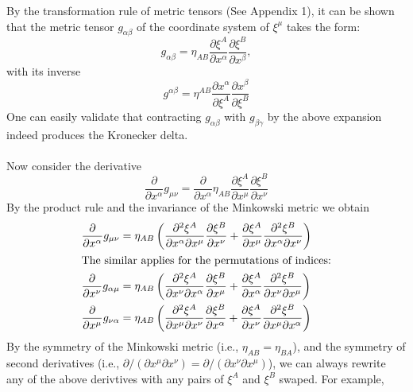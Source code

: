 \documentclass{article}
\begin{document}
By the transformation rule of metric tensors (See Appendix 1), it can be shown 
that the metric tensor $g_{\alpha\beta}$ of the coordinate system of 
$\xi^\mu$ takes the form:
\[
g_{\alpha\beta} = \eta_{AB} \frac{\partial \xi^A}{\partial x^\alpha} \frac{\partial \xi^B}{\partial x^\beta},
\]
with its inverse
\[
g^{\alpha\beta} = \eta^{AB} \frac{\partial x^\alpha}{\partial \xi^A} \frac{\partial x^\beta}{\partial \xi^B}
\]
One can easily validate that contracting $g_{\alpha\beta}$ with 
$g_{\beta\gamma}$ by the above expansion indeed produces the 
Kronecker delta.\\\\
Now consider the derivative
\[
\frac{\partial}{\partial x^\alpha} g_{\mu\nu} = 
\frac{\partial}{\partial x^\alpha} \eta_{AB} \frac{\partial \xi^A}{\partial x^\mu} \frac{\partial \xi^B}{\partial x^\nu}
\]
By the product rule and the invariance of the Minkowski metric we obtain
\begin{align*}
\frac{\partial}{\partial x^\alpha} g_{\mu\nu} &= 
\eta_{AB} \left(\frac{\partial^2 \xi^A}{\partial x^\alpha \partial x^\mu} \frac{\partial \xi^B}{\partial x^\nu}
+ \frac{\partial \xi^A}{\partial x^\mu} \frac{\partial^2 \xi^B}{\partial x^\alpha \partial x^\nu}\right) \\
\intertext{The similar applies for the permutations of indices:} 
\frac{\partial}{\partial x^\nu} g_{\alpha\mu} &= 
\eta_{AB} \left(\frac{\partial^2 \xi^A}{\partial x^\nu \partial x^\alpha} \frac{\partial \xi^B}{\partial x^\mu}
+ \frac{\partial \xi^A}{\partial x^\alpha} \frac{\partial^2 \xi^B}{\partial x^\nu \partial x^\mu}\right) \\
\frac{\partial}{\partial x^\mu} g_{\nu\alpha} &= 
\eta_{AB} \left(\frac{\partial^2 \xi^A}{\partial x^\mu \partial x^\nu} \frac{\partial \xi^B}{\partial x^\alpha}
+ \frac{\partial \xi^A}{\partial x^\nu} \frac{\partial^2 \xi^B}{\partial x^\mu \partial x^\alpha}\right)
\end{align*}
By the symmetry of the Minkowski metric (i.e., $\eta_{AB} = \eta_{BA}$), and the symmetry of 
second derivatives (i.e., $\partial / (\partial x^\mu \partial x^\nu) =  \partial / 
(\partial x^\nu \partial x^\mu) $), we can always rewrite any of the above derivtives with any pairs of 
$\xi^A$ and $\xi^B$ swaped. For example, 
\end{document}
